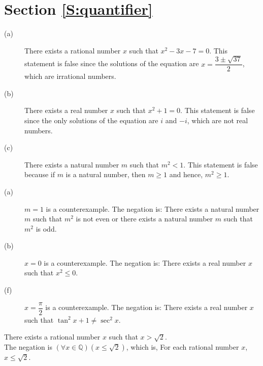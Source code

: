 \section*{Section \ref{S:quantifier}}

\begin{list}{\bf{\ref{exer:sec24-1}.}} 
\item \begin{description} 
\item[(a)] There exists a rational number $x$ such that $x^2 - 3x - 7 = 0$.  This statement is false since the solutions of the equation are 
$x = \dfrac{3 \pm \sqrt{37}}{2}$, which are irrational numbers.
\item[(b)] There exists a real number $x$ such that $x^2 + 1 = 0$.  This statement is false since the only solutions of the equation are $i$ and $-i$, which are not real numbers.
\item[(c)]  There exists a natural number $m$ such that $m^2 < 1$.  This statement is false because if $m$ is a natural number, then $m \geq 1$ and hence, $m^2 \geq 1$. 
\end{description}
\end{list}

\begin{list}{\bf{\ref{exer:sec24-2new}.}}
\item \begin{description}
  \item[(a)] $m = 1$ is a counterexample.  The negation is:  There exists a natural number $m$ such that $m^2$ is not even or there exists a natural number $m$ such that $m^2$ is odd.
  \item[(b)]  $x = 0$ is a counterexample.  The negation is:  There exists a real number $x$ such that $x^2 \leq 0$.
  \item[(f)]  $x = \dfrac{\pi}{2}$ is a counterexample.  The negation is:  There exists a real number $x$ such that 
$\tan^2 x + 1 \ne \sec^2 x$.
\end{description}
\end{list}



\begin{list}{\bf{\ref{exer:sec24-2}.}} 
\item \begin{list}{\bf{(a)}}
\item There exists a rational number $x$ such that $x > \sqrt{2}$. \\
The negation is $\left( {\forall x \in \mathbb{Q}} \right)\left( {x \leq \sqrt 2 } \right)$, which is, For each rational number $x$, $x \le \sqrt{2}$.
\end{list}
\end{list}

